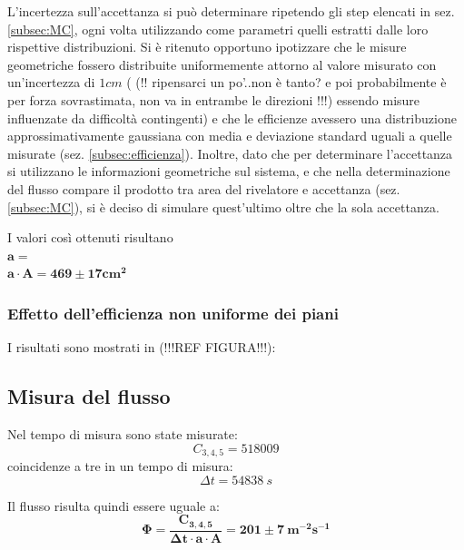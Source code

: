 \documentclass[11pt]{article}
\begin{document}
\begin{flushleft}
L'incertezza sull'accettanza si può determinare ripetendo gli step elencati in sez. \ref{subsec:MC}, ogni volta utilizzando come parametri quelli estratti dalle loro rispettive distribuzioni. Si è ritenuto opportuno ipotizzare che le misure geometriche fossero distribuite uniformemente attorno al valore misurato con un'incertezza di $1 cm$ ( (!! ripensarci un po'..non è tanto? e poi probabilmente è per forza sovrastimata, non va in entrambe le direzioni !!!) essendo misure influenzate da difficoltà contingenti) e che le efficienze avessero una distribuzione approssimativamente gaussiana con media e deviazione standard uguali a quelle misurate (sez. \ref{subsec:efficienza}). Inoltre, dato che per determinare l'accettanza si utilizzano le informazioni geometriche sul sistema, e che nella determinazione del flusso compare il prodotto tra area del rivelatore e accettanza (sez. \ref{subsec:MC}), si è deciso di simulare quest'ultimo oltre che la sola accettanza.

I valori così ottenuti risultano \\
$
\mathbf{a = } 
$
\\
$
\mathbf{ a \cdot A =  469 \pm 17 cm^2}
$

\subsubsection{Effetto dell'efficienza non uniforme dei piani}

I risultati sono mostrati in (!!!REF FIGURA!!!): \\




\subsection{Misura del flusso}
Nel tempo di misura sono state misurate: \\
\begin{equation}
C_{3,4,5} = 518009
\nonumber
\end{equation}
coincidenze a tre in un tempo di misura: \\
\begin{equation}
\Delta t = 54838 \ s
\nonumber
\end{equation}

Il flusso risulta quindi essere uguale a: \\
\begin{equation}
\mathbf{\Phi = \frac{C_{3,4,5}}{\Delta t \cdot a \cdot A} = 201 \pm 7 \ m^{-2} s^{-1}} 
\nonumber
\end{equation}


\end{flushleft}
\end{document}
